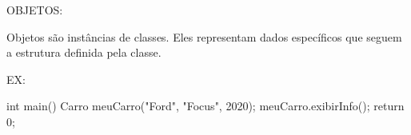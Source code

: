 OBJETOS:

Objetos são instâncias de classes. 
Eles representam dados específicos que seguem a estrutura definida pela classe.

EX:

int main() {
    Carro meuCarro("Ford", "Focus", 2020);
    meuCarro.exibirInfo();
    return 0;
}